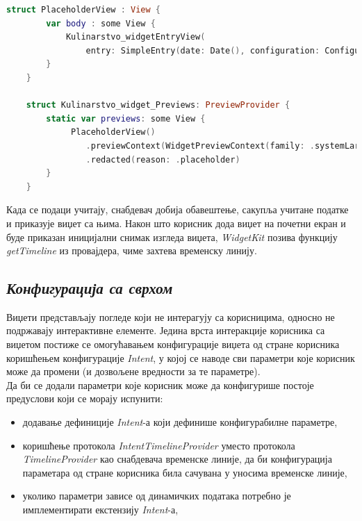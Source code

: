 \documentclass[12pt,oneside]{memoir}
\begin{document}
\begin{lstlisting}[caption=\textit{{Виџет --- placeholder}}, label={lst:виџет - placeholder}, language=Swift, frame=single]
    struct PlaceholderView : View {
        var body : some View {
            Kulinarstvo_widgetEntryView(
                entry: SimpleEntry(date: Date(), configuration: ConfigurationIntent(), recipe: Datafeed.shared.favRecipes[0], parameterToShow: MainParameter.Sastojci.rawValue))
        }
    }
    
    struct Kulinarstvo_widget_Previews: PreviewProvider {
        static var previews: some View {
             PlaceholderView()
                .previewContext(WidgetPreviewContext(family: .systemLarge))
                .redacted(reason: .placeholder)
        }
    }
\end{lstlisting}

\indent Када се подаци учитају, снабдевач добија обавештење, сакупља учитане податке и приказује виџет са њима. Након што корисник дода виџет на почетни екран и буде приказан иницијални снимак изгледа виџета, \textit{WidgetKit} позива функцију \textit{getTimeline} из провајдера, чиме захтева временску линију.

\subsection{\textit{Конфигурација са сврхом}}
\label{subsec:Intent}
\indent Виџети представљају погледе који не интерагују са корисницима, односно не подржавају интерактивне елементе. Једина врста интеракције корисника са виџетом постиже се омогућавањем конфигурације виџета од стране корисника коришћењем конфигурације \textit{Intent}, у којој се наводе сви параметри које корисник може да промени (и дозвољене вредности за те параметре). 
\\
\indent Да би се додали параметри које корисник може да конфигурише постоје предуслови који се морају испунити:
\begin{itemize}
    \item додавање дефиниције \textit{Intent}-а који дефинише конфигурабилне параметре,
    \item коришћење протокола \textit{IntentTimelineProvider} уместо протокола \textit{Timeli\-neProvider} као снабдевача временске линије, да би конфигурација параметара од стране корисника била сачувана у уносима временске линије,
    \item уколико параметри зависе од динамичких података потребно је имплементирати екстензију \textit{Intent}-а,
\end{itemize}
\end{document}
